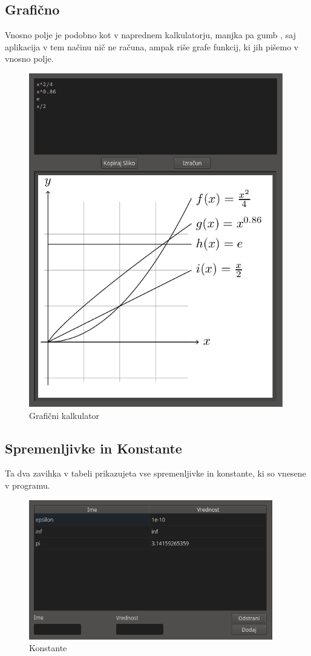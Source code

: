 \documentclass[12pt,titlepage]{report}
\begin{document}
		\parbox{\textwidth}{
		\subsection{Grafično}
			Vnosno polje je podobno kot v naprednem kalkulatorju, manjka pa gumb , saj aplikacija v tem načinu nič ne računa, ampak riše grafe funkcij, ki jih pišemo v vnosno polje.
			\begin{figure}[H]
				\centering
				\includegraphics[height=550px]{mw_plot.png}
				\caption{Grafični kalkulator}
				\label{fig:mw_plot}
			\end{figure}}
		\parbox{\textwidth}{
		\subsection{Spremenljivke in Konstante}
			Ta dva zavihka v tabeli prikazujeta vse spremenljivke in konstante, ki so vnesene v programu.
			\begin{figure}[H]
				\centering
				\includegraphics[height=230px]{mw_const.png}
				\caption{Konstante}
				\label{fig:mw_const}
			\end{figure}}
\end{document}
